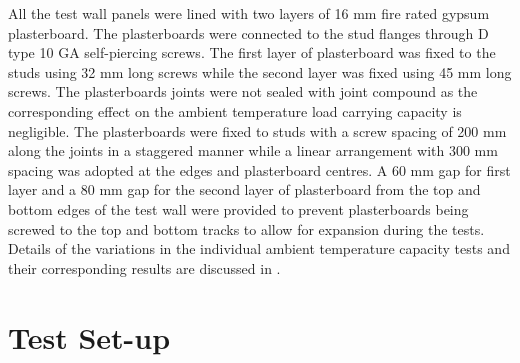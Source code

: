 All the test wall panels were lined with two layers of 16 mm fire rated gypsum plasterboard. The plasterboards were connected to the stud flanges through D type 10 GA self-piercing screws. The first layer of plasterboard was fixed to the studs using 32 mm long screws while the second layer was fixed using 45 mm long screws. The plasterboards joints were not sealed with joint compound as the corresponding effect on the ambient temperature load carrying capacity is negligible. The plasterboards were fixed to studs with a screw spacing of 200 mm along the joints in a staggered manner while a linear arrangement with 300 mm spacing was adopted at the edges and plasterboard centres. A 60 mm gap for first layer and a 80 mm gap for the second layer of plasterboard from the top and bottom edges of the test wall were provided to prevent plasterboards being screwed to the top and bottom tracks to allow for expansion during the tests. Details of the variations in the individual ambient temperature capacity tests and their corresponding results are discussed in .

\section{Test Set-up}


